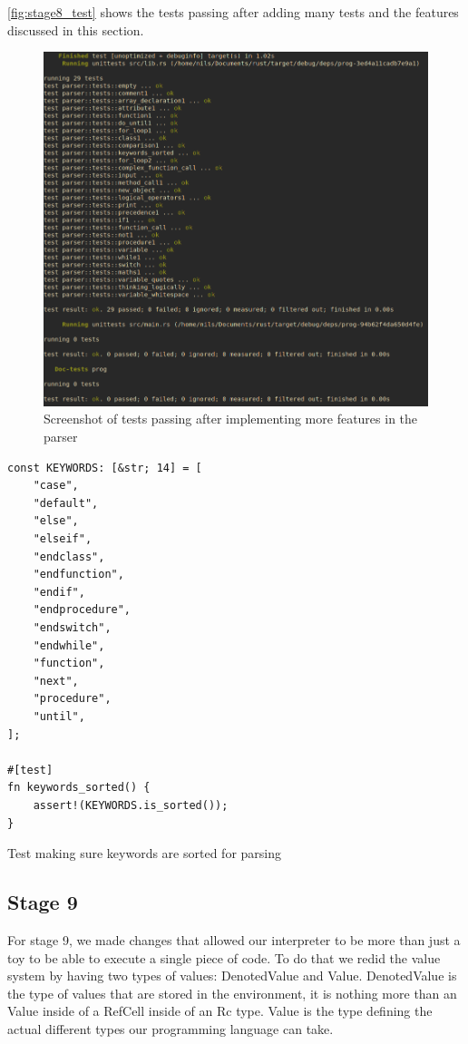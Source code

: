 \documentclass{article}
\begin{document}
\autoref{fig:stage8_test} shows the tests passing after adding many tests and
the features discussed in this section.

\begin{figure}
	\includegraphics[width=\textwidth]{stage8_test}
	\caption{Screenshot of tests passing after implementing more features in
	the parser}
	\label{fig:stage8_test}
\end{figure}

\begin{listing}
	\begin{verbatim}
const KEYWORDS: [&str; 14] = [
    "case",
    "default",
    "else",
    "elseif",
    "endclass",
    "endfunction",
    "endif",
    "endprocedure",
    "endswitch",
    "endwhile",
    "function",
    "next",
    "procedure",
    "until",
];

#[test]
fn keywords_sorted() {
	assert!(KEYWORDS.is_sorted());
}
	\end{verbatim}
	\caption{Test making sure keywords are sorted for parsing}
	\label{lst:sorted_keywords}
\end{listing}

\subsection{Stage 9}

For stage 9, we made changes that allowed our interpreter to be more than just
a toy to be able to execute a single piece of code. To do that we redid the
value system by having two types of values: DenotedValue and Value.
DenotedValue is the type of values that are stored in the environment, it is
nothing more than an Value inside of a RefCell inside of an Rc type. Value
is the type defining the actual different types our programming language can
take.
\end{document}
